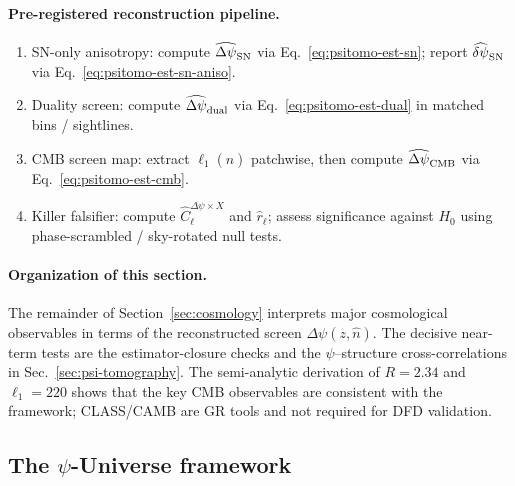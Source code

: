 \paragraph{Pre-registered reconstruction pipeline.}
\begin{enumerate}
\item SN-only anisotropy: compute $\widehat{\Delta\psi}_{\rm SN}$ via Eq.~\eqref{eq:psitomo-est-sn}; report $\widehat{\delta\psi}_{\rm SN}$ via Eq.~\eqref{eq:psitomo-est-sn-aniso}.
\item Duality screen: compute $\widehat{\Delta\psi}_{\rm dual}$ via Eq.~\eqref{eq:psitomo-est-dual} in matched bins / sightlines.
\item CMB screen map: extract $\ell_1(\hat n)$ patchwise, then compute $\widehat{\Delta\psi}_{\rm CMB}$ via Eq.~\eqref{eq:psitomo-est-cmb}.
\item Killer falsifier: compute $\widehat C_\ell^{\Delta\psi\times X}$ and $\widehat r_\ell$; assess significance against $H_0$ using phase-scrambled / sky-rotated null tests.
\end{enumerate}

\paragraph{Organization of this section.}
The remainder of Section~\ref{sec:cosmology} interprets major cosmological observables in terms of the reconstructed screen $\Delta\psi(z,\hat n)$.
The decisive near-term tests are the estimator-closure checks and the $\psi$--structure cross-correlations in Sec.~\ref{sec:psi-tomography}. The semi-analytic derivation of $R = 2.34$ and $\ell_1 = 220$ shows that the key CMB observables are consistent with the framework; CLASS/CAMB are GR tools and not required for DFD validation.


\subsection{The $\psi$-Universe framework}\label{sec:psi-universe}

